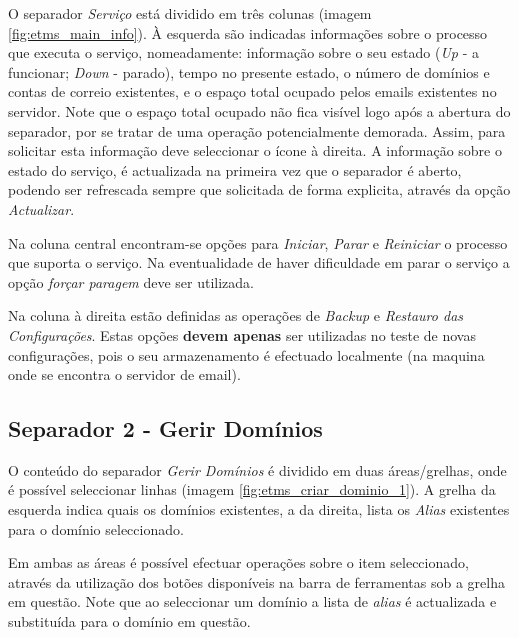 O separador \textit{Serviço} está dividido em três colunas (imagem \ref{fig:etms_main_info}). À esquerda são indicadas informações sobre o processo que executa o serviço, nomeadamente: informação sobre o seu estado (\textit{Up} - a funcionar; \textit{Down} - parado), tempo no presente estado, o número de domínios e contas de correio existentes, e o espaço total ocupado pelos emails existentes no servidor. Note que o espaço total ocupado não fica visível logo após a abertura do separador, por se tratar de uma operação potencialmente demorada. Assim, para solicitar esta informação deve seleccionar o ícone à direita. A informação sobre o estado do serviço, é actualizada na primeira vez que o separador é aberto, podendo ser refrescada sempre que solicitada de forma explicita, através da opção \textit{Actualizar}.

Na coluna central encontram-se opções para \textit{Iniciar}, \textit{Parar} e \textit{Reiniciar} o processo que suporta o serviço. Na eventualidade de haver dificuldade em parar o serviço a opção \textit{forçar paragem} deve ser utilizada.

Na coluna à direita estão definidas as operações de \textit{Backup} e \textit{Restauro das Configurações}. Estas opções \textbf{devem apenas} ser utilizadas no teste de novas configurações, pois o seu armazenamento é efectuado localmente (na maquina onde se encontra o servidor de email).

\subsection{Separador 2 - Gerir Domínios}
\label{sec:etms_gerir_dominios}

O conteúdo do separador \textit{Gerir Domínios} é dividido em duas áreas/grelhas, onde é possível seleccionar linhas (imagem \ref{fig:etms_criar_dominio_1}). A grelha da esquerda indica quais os domínios existentes, a da direita, lista os \textit{Alias} existentes para o domínio seleccionado.

Em ambas as áreas é possível efectuar operações sobre o item seleccionado, através da utilização dos botões disponíveis na barra de ferramentas sob a grelha em questão. Note que ao seleccionar um domínio a lista de \textit{alias} é actualizada e substituída para o domínio em questão.

